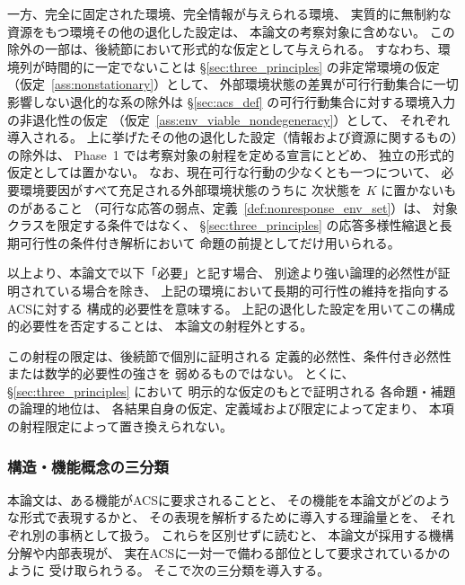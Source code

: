 一方、完全に固定された環境、完全情報が与えられる環境、
実質的に無制約な資源をもつ環境その他の退化した設定は、
本論文の考察対象に含めない。
この除外の一部は、後続節において形式的な仮定として与えられる。
すなわち、環境列が時間的に一定でないことは
\S\ref{sec:three_principles} の非定常環境の仮定
（仮定~\ref{ass:nonstationary}）として、
外部環境状態の差異が可行行動集合に一切影響しない退化的な系の除外は
\S\ref{sec:acs_def} の可行行動集合に対する環境入力の非退化性の仮定
（仮定~\ref{ass:env_viable_nondegeneracy}）として、
それぞれ導入される。
上に挙げたその他の退化した設定（情報および資源に関するもの）の除外は、
Phase~1 では考察対象の射程を定める宣言にとどめ、
独立の形式的仮定としては置かない。
なお、現在可行な行動の少なくとも一つについて、
必要環境要因がすべて充足される外部環境状態のうちに
次状態を $K$ に置かないものがあること
（可行な応答の弱点、定義~\ref{def:nonresponse_env_set}）は、
対象クラスを限定する条件ではなく、
\S\ref{sec:three_principles} の応答多様性縮退と長期可行性の条件付き解析において
命題の前提としてだけ用いられる。

以上より、本論文で以下「必要」と記す場合、
別途より強い論理的必然性が証明されている場合を除き、
上記の環境において長期的可行性の維持を指向するACSに対する
構成的必要性を意味する。
上記の退化した設定を用いてこの構成的必要性を否定することは、
本論文の射程外とする。

この射程の限定は、後続節で個別に証明される
定義的必然性、条件付き必然性または数学的必要性の強さを
弱めるものではない。
とくに、\S\ref{sec:three_principles} において
明示的な仮定のもとで証明される
各命題・補題の論理的地位は、
各結果自身の仮定、定義域および限定によって定まり、
本項の射程限定によって置き換えられない。

\subsubsection{構造・機能概念の三分類}
\label{subsubsec:abc_classification}

本論文は、ある機能がACSに要求されることと、
その機能を本論文がどのような形式で表現するかと、
その表現を解析するために導入する理論量とを、
それぞれ別の事柄として扱う。
これらを区別せずに読むと、
本論文が採用する機構分解や内部表現が、
実在ACSに一対一で備わる部位として要求されているかのように
受け取られうる。
そこで次の三分類を導入する。

